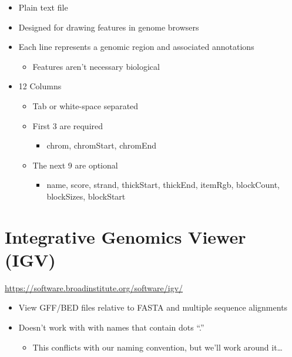 \documentclass[
]{book}
\providecommand{\tightlist}{%
  \setlength{\itemsep}{0pt}\setlength{\parskip}{0pt}}
\begin{document}
\begin{itemize}
\tightlist
\item
  Plain text file
\item
  Designed for drawing features in genome browsers
\item
  Each line represents a genomic region and associated annotations

  \begin{itemize}
  \tightlist
  \item
    Features aren't necessary biological
  \end{itemize}
\item
  12 Columns

  \begin{itemize}
  \tightlist
  \item
    Tab or white-space separated
  \item
    First 3 are required

    \begin{itemize}
    \tightlist
    \item
      chrom, chromStart, chromEnd
    \end{itemize}
  \item
    The next 9 are optional

    \begin{itemize}
    \tightlist
    \item
      name, score, strand, thickStart, thickEnd, itemRgb, blockCount, blockSizes, blockStart
    \end{itemize}
  \end{itemize}
\end{itemize}

\hypertarget{integrative-genomics-viewer-igv}{%
\section{Integrative Genomics Viewer (IGV)}\label{integrative-genomics-viewer-igv}}

\url{https://software.broadinstitute.org/software/igv/}

\begin{itemize}
\tightlist
\item
  View GFF/BED files relative to FASTA and multiple sequence alignments
\item
  Doesn't work with with names that contain dots ``.''

  \begin{itemize}
  \tightlist
  \item
    This conflicts with our naming convention, but we'll work around it\ldots{}
  \end{itemize}
\end{itemize}
\end{document}
